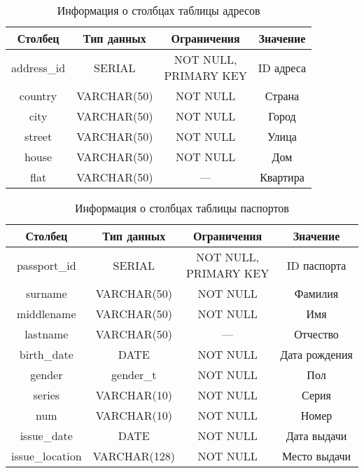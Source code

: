 \begin{table}[h!]
\begin{center}
	\captionsetup{justification=raggedright,singlelinecheck=off,margin=5mm}
	\caption{Информация о столбцах таблицы адресов}
	\begin{tabular}{| c | c | c | c |}
		\hline
		Столбец & Тип данных & Ограничения & Значение \\
		\hline
		address\_id & SERIAL & \makecell{NOT NULL, \\ PRIMARY KEY} & ID адреса \\
		\hline
		country & VARCHAR(50) & NOT NULL & Страна \\
		\hline
		city & VARCHAR(50) & NOT NULL & Город \\
		\hline
		street & VARCHAR(50) & NOT NULL & Улица \\
		\hline
		house & VARCHAR(50) & NOT NULL & Дом \\
		\hline
		flat & VARCHAR(50) & --- & Квартира \\
		\hline
	\end{tabular}
	\label{table:addresses-columns}
\end{center}
\end{table}

\begin{table}[h!]
\begin{center}
	\captionsetup{justification=raggedright,singlelinecheck=off,margin=5mm}
	\caption{Информация о столбцах таблицы паспортов}
	\begin{tabular}{| c | c | c | c |}
		\hline
		Столбец & Тип данных & Ограничения & Значение \\
		\hline
		passport\_id & SERIAL & \makecell{NOT NULL, \\ PRIMARY KEY} & ID паспорта \\
		\hline
		surname & VARCHAR(50) & NOT NULL & Фамилия \\
		\hline
		middlename & VARCHAR(50) & NOT NULL & Имя \\
		\hline
		lastname & VARCHAR(50) & --- & Отчество \\
		\hline
		birth\_date & DATE & NOT NULL & Дата рождения\\
		\hline
		gender & gender\_t & NOT NULL & Пол \\
		\hline
		series & VARCHAR(10) & NOT NULL & Серия \\
		\hline
		num & VARCHAR(10) & NOT NULL & Номер \\
		\hline
		issue\_date & DATE & NOT NULL & Дата выдачи\\
		\hline
		issue\_location & VARCHAR(128) & NOT NULL & Место выдачи \\
		\hline
	\end{tabular}
	\label{table:passports-columns}
\end{center}
\end{table}

